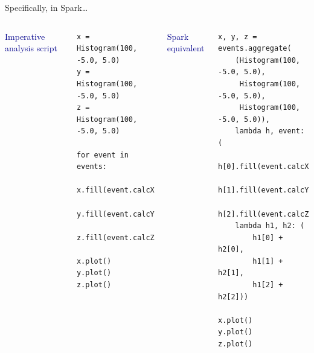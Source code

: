 \documentclass[aspectratio=169]{beamer}
\begin{document}
\begin{frame}[fragile]{Specifically, in Spark\ldots}
\vspace{0.5 cm}
\begin{columns}

\textcolor{darkblue}{Imperative analysis script}
\small
\begin{verbatim}
x = Histogram(100, -5.0, 5.0)
y = Histogram(100, -5.0, 5.0)
z = Histogram(100, -5.0, 5.0)

for event in events:
    x.fill(event.calcX())
    y.fill(event.calcY())
    z.fill(event.calcZ())

x.plot()
y.plot()
z.plot()
\end{verbatim}

\textcolor{darkblue}{Spark equivalent}
\small
\begin{verbatim}
x, y, z = events.aggregate(
    (Histogram(100, -5.0, 5.0),
     Histogram(100, -5.0, 5.0),
     Histogram(100, -5.0, 5.0)),
    lambda h, event: (
        h[0].fill(event.calcX()),
        h[1].fill(event.calcY()),
        h[2].fill(event.calcZ())),
    lambda h1, h2: (
        h1[0] + h2[0],
        h1[1] + h2[1],
        h1[2] + h2[2]))

x.plot()
y.plot()
z.plot()
\end{verbatim}
\end{columns}
\end{frame}
\end{document}
